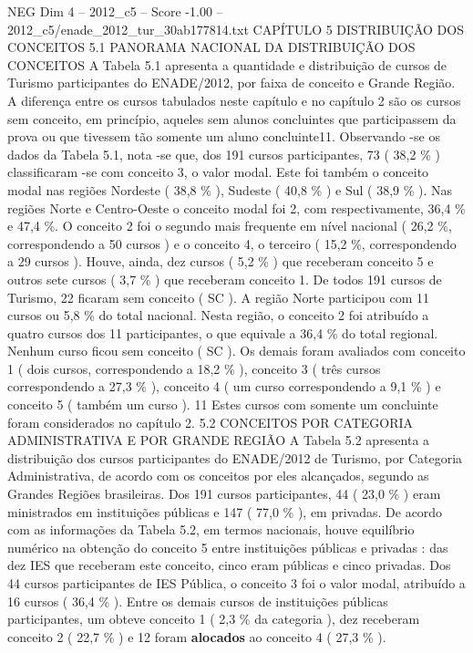 \begin{textsample}{NEG Dim 4 – 2012\_c5 – Score -1.00 – 2012\_c5/enade\_2012\_tur\_30ab177814.txt}  \label{ex:f4_neg_103}
CAPÍTULO 5 DISTRIBUIÇÃO DOS CONCEITOS 5.1 PANORAMA NACIONAL DA DISTRIBUIÇÃO DOS CONCEITOS A Tabela 5.1 apresenta a quantidade e distribuição de cursos de Turismo participantes do ENADE/2012, por faixa de conceito e Grande Região.
A diferença entre os cursos tabulados neste capítulo e no capítulo 2 são os cursos sem conceito, em princípio, aqueles sem alunos concluintes que participassem da prova ou que tivessem tão somente um aluno concluinte11.
Observando -se os dados da Tabela 5.1, nota -se que, dos 191 cursos participantes, 73 ( 38,2 \% ) classificaram -se com conceito 3, o valor modal.
Este foi também o conceito modal nas regiões Nordeste ( 38,8 \% ), Sudeste ( 40,8 \% ) e Sul ( 38,9 \% ).
Nas regiões Norte e Centro-Oeste o conceito modal foi 2, com respectivamente, 36,4 \% e 47,4 \%.
O conceito 2 foi o segundo mais frequente em nível nacional ( 26,2 \%, correspondendo a 50 cursos ) e o conceito 4, o terceiro ( 15,2 \%, correspondendo a 29 cursos ).
Houve, ainda, dez cursos ( 5,2 \% ) que receberam conceito 5 e outros sete cursos ( 3,7 \% ) que receberam conceito 1.
De todos 191 cursos de Turismo, 22 ficaram sem conceito ( SC ).
A região Norte participou com 11 cursos ou 5,8 \% do total nacional.
Nesta região, o conceito 2 foi atribuído a quatro cursos dos 11 participantes, o que equivale a 36,4 \% do total regional.
Nenhum curso ficou sem conceito ( SC ).
Os demais foram avaliados com conceito 1 ( dois cursos, correspondendo a 18,2 \% ), conceito 3 ( três cursos correspondendo a 27,3 \% ), conceito 4 ( um curso correspondendo a 9,1 \% ) e conceito 5 ( também um curso ). 11 Estes cursos com somente um concluinte foram considerados no capítulo 2. 5.2 CONCEITOS POR CATEGORIA ADMINISTRATIVA E POR GRANDE REGIÃO A Tabela 5.2 apresenta a distribuição dos cursos participantes do ENADE/2012 de Turismo, por Categoria Administrativa, de acordo com os conceitos por eles alcançados, segundo as Grandes Regiões brasileiras.
Dos 191 cursos participantes, 44 ( 23,0 \% ) eram ministrados em instituições públicas e 147 ( 77,0 \% ), em privadas.
De acordo com as informações da Tabela 5.2, em termos nacionais, houve equilíbrio numérico na obtenção do conceito 5 entre instituições públicas e privadas : das dez IES que receberam este conceito, cinco eram públicas e cinco privadas.
Dos 44 cursos participantes de IES Pública, o conceito 3 foi o valor modal, atribuído a 16 cursos ( 36,4 \% ).
Entre os demais cursos de instituições públicas participantes, um obteve conceito 1 ( 2,3 \% da categoria ), dez receberam conceito 2 ( 22,7 \% ) e 12 foram \textbf{alocados} ao conceito 4 ( 27,3 \% ).

\end{textsample}

